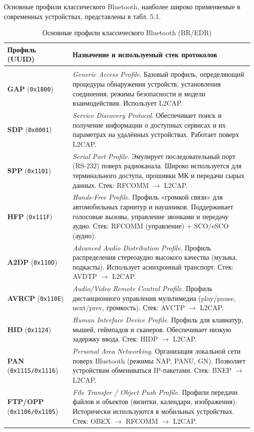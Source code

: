 Основные профили классического Bluetooth, наиболее широко применяемые в современных устройствах, представлены в табл. 5.1.

\begin{xltabular}{\textwidth}{>{\raggedright\arraybackslash}l >{\raggedright\arraybackslash}X}
\caption{Основные профили классического Bluetooth (BR/EDR)}
\label{tab:classical_bt_profiles} \\
\toprule
\textbf{Профиль (UUID)} & \textbf{Назначение и используемый стек протоколов} \\
\midrule
\endfirsthead
 \\
\midrule
\endhead
\bottomrule
\endfoot

\textbf{GAP} (\texttt{0x1800}) & \textit{Generic Access Profile}. Базовый профиль, определяющий процедуры обнаружения устройств, установления соединения, режимы безопасности и модели взаимодействия. Использует L2CAP. \\
\textbf{SDP} (\texttt{0x0001}) & \textit{Service Discovery Protocol}. Обеспечивает поиск и получение информации о доступных сервисах и их параметрах на удалённых устройствах. Работает поверх L2CAP. \\
\textbf{SPP} (\texttt{0x1101}) & \textit{Serial Port Profile}. Эмулирует последовательный порт (RS-232) поверх радиоканала. Широко используется для терминального доступа, прошивки МК и передачи сырых данных. Стек: RFCOMM $\rightarrow$ L2CAP. \\
\textbf{HFP} (\texttt{0x111F}) & \textit{Hands-Free Profile}. Профиль «громкой связи» для автомобильных гарнитур и наушников. Поддерживает голосовые вызовы, управление звонками и передачу аудио. Стек: RFCOMM (управление) + SCO/eSCO (аудио). \\
\textbf{A2DP} (\texttt{0x110D}) & \textit{Advanced Audio Distribution Profile}. Профиль распределения стереоаудио высокого качества (музыка, подкасты). Использует асинхронный транспорт. Стек: AVDTP $\rightarrow$ L2CAP. \\
\textbf{AVRCP} (\texttt{0x110E}) & \textit{Audio/Video Remote Control Profile}. Профиль дистанционного управления мультимедиа (play/pause, next/prev, громкость). Стек: AVCTP $\rightarrow$ L2CAP. \\
\textbf{HID} (\texttt{0x1124}) & \textit{Human Interface Device Profile}. Профиль для клавиатур, мышей, геймпадов и сканеров. Обеспечивает низкую задержку ввода. Стек: HIDP $\rightarrow$ L2CAP. \\
\textbf{PAN} (\texttt{0x1115/0x1116}) & \textit{Personal Area Networking}. Организация локальной сети поверх Bluetooth (режимы NAP, PANU, GN). Позволяет устройствам обмениваться IP-пакетами. Стек: BNEP $\rightarrow$ L2CAP. \\
\textbf{FTP/OPP} (\texttt{0x1106/0x1105}) & \textit{File Transfer / Object Push Profile}. Профили передачи файлов и объектов (визитки, календари, изображения). Исторически используются в мобильных устройствах. Стек: OBEX $\rightarrow$ RFCOMM $\rightarrow$ L2CAP. \\
\end{xltabular}

